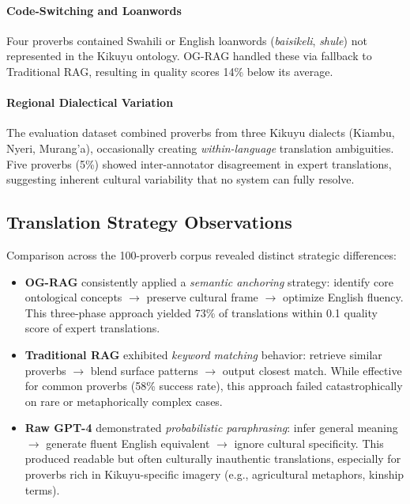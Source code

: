 \paragraph{Code-Switching and Loanwords} Four proverbs contained Swahili or English loanwords (\emph{baisikeli}, \emph{shule}) not represented in the Kikuyu ontology. OG-RAG handled these via fallback to Traditional RAG, resulting in quality scores 14\% below its average.

\paragraph{Regional Dialectical Variation} The evaluation dataset combined proverbs from three Kikuyu dialects (Kiambu, Nyeri, Murang'a), occasionally creating \emph{within-language} translation ambiguities. Five proverbs (5\%) showed inter-annotator disagreement in expert translations, suggesting inherent cultural variability that no system can fully resolve.

\subsection{Translation Strategy Observations}
\label{subsec:strategy_observations}

Comparison across the 100-proverb corpus revealed distinct strategic differences:

\begin{itemize}
    \item \textbf{OG-RAG} consistently applied a \emph{semantic anchoring} strategy: identify core ontological concepts $\rightarrow$ preserve cultural frame $\rightarrow$ optimize English fluency. This three-phase approach yielded 73\% of translations within 0.1 quality score of expert translations.
    
    \item \textbf{Traditional RAG} exhibited \emph{keyword matching} behavior: retrieve similar proverbs $\rightarrow$ blend surface patterns $\rightarrow$ output closest match. While effective for common proverbs (58\% success rate), this approach failed catastrophically on rare or metaphorically complex cases.
    
    \item \textbf{Raw GPT-4} demonstrated \emph{probabilistic paraphrasing}: infer general meaning $\rightarrow$ generate fluent English equivalent $\rightarrow$ ignore cultural specificity. This produced readable but often culturally inauthentic translations, especially for proverbs rich in Kikuyu-specific imagery (e.g., agricultural metaphors, kinship terms).
\end{itemize}

